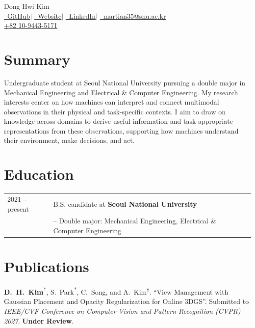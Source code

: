 \documentclass[a4paper,11pt]{article}
\newcommand{\faGithub}{}\newcommand{\faGlobe}{}%
\newcommand{\faLinkedin}{}\newcommand{\faEnvelope}{}%
\begin{document}
\begin{center}
{\Huge Dong Hwi Kim}\\[6pt]
\href{https://github.com/martian35}{\faGithub\ GitHub}\enspace$|$\enspace
\href{https://martian35.github.io/}{\faGlobe\ Website}\enspace$|$\enspace
\href{https://www.linkedin.com/in/martian35/}{\faLinkedin\ LinkedIn}\enspace$|$\enspace
\href{mailto:martian35@snu.ac.kr}{\faEnvelope\ martian35@snu.ac.kr}\\[3pt]
\href{tel:+821094435171}{+82 10-9443-5171}
\end{center}
\vspace{-6pt}

\section{Summary}
Undergraduate student at Seoul National University pursuing a double major
in Mechanical Engineering and Electrical \& Computer Engineering.
My research interests center on how machines can interpret and connect
multimodal observations in their physical and task-specific contexts.
I aim to draw on knowledge across domains to derive useful information
and task-appropriate representations from these observations, supporting
how machines understand their environment, make decisions, and act.

\section{Education}
\begin{tabularx}{\linewidth}{@{}p{30mm}>{\raggedright\arraybackslash}X@{}}
2021 -- present & B.S. candidate at \textbf{Seoul National University}\\
& -- Double major: Mechanical Engineering, Electrical \& Computer Engineering
\end{tabularx}

\section{Publications}
\begin{enumerate}[label={[\arabic*]},labelindent=0pt,leftmargin=*,labelsep=0.5em,align=left,nosep]
\item \textbf{D.\ H.\ Kim}\textsuperscript{*}, S.\ Park\textsuperscript{*},
C.\ Song, and A.\ Kim\textsuperscript{\ensuremath{\dagger}}.
``View Management with Gaussian Placement and Opacity Regularization for Online 3DGS''.
Submitted to \textit{IEEE/CVF Conference on Computer Vision and Pattern Recognition (CVPR) 2027}.
\textbf{Under Review}.
\end{enumerate}
\end{document}
